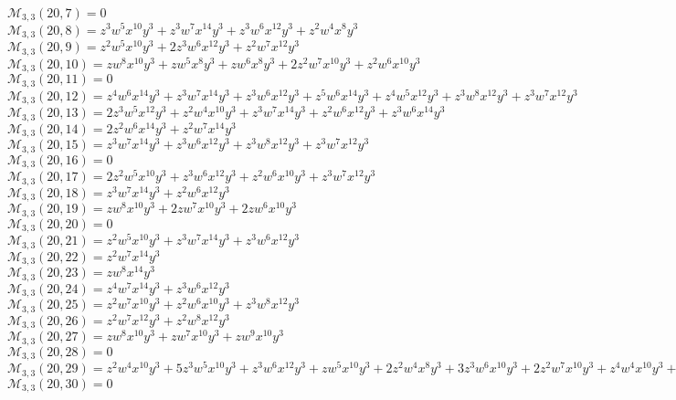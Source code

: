 $\mathcal{M}_{3,3}(20,7)=0$\\
$\mathcal{M}_{3,3}(20,8)=z^3w^5x^{10}y^3+z^3w^7x^{14}y^3+z^3w^6x^{12}y^3+z^2w^4x^8y^3$\\
$\mathcal{M}_{3,3}(20,9)=z^2w^5x^{10}y^3+2z^3w^6x^{12}y^3+z^2w^7x^{12}y^3$\\
$\mathcal{M}_{3,3}(20,10)=zw^8x^{10}y^3+zw^5x^8y^3+zw^6x^8y^3+2z^2w^7x^{10}y^3+z^2w^6x^{10}y^3$\\
$\mathcal{M}_{3,3}(20,11)=0$\\
$\mathcal{M}_{3,3}(20,12)=z^4w^6x^{14}y^3+z^3w^7x^{14}y^3+z^3w^6x^{12}y^3+z^5w^6x^{14}y^3+z^4w^5x^{12}y^3+z^3w^8x^{12}y^3+z^3w^7x^{12}y^3$\\
$\mathcal{M}_{3,3}(20,13)=2z^3w^5x^{12}y^3+z^2w^4x^{10}y^3+z^3w^7x^{14}y^3+z^2w^6x^{12}y^3+z^3w^6x^{14}y^3$\\
$\mathcal{M}_{3,3}(20,14)=2z^2w^6x^{14}y^3+z^2w^7x^{14}y^3$\\
$\mathcal{M}_{3,3}(20,15)=z^3w^7x^{14}y^3+z^3w^6x^{12}y^3+z^3w^8x^{12}y^3+z^3w^7x^{12}y^3$\\
$\mathcal{M}_{3,3}(20,16)=0$\\
$\mathcal{M}_{3,3}(20,17)=2z^2w^5x^{10}y^3+z^3w^6x^{12}y^3+z^2w^6x^{10}y^3+z^3w^7x^{12}y^3$\\
$\mathcal{M}_{3,3}(20,18)=z^3w^7x^{14}y^3+z^2w^6x^{12}y^3$\\
$\mathcal{M}_{3,3}(20,19)=zw^8x^{10}y^3+2zw^7x^{10}y^3+2zw^6x^{10}y^3$\\
$\mathcal{M}_{3,3}(20,20)=0$\\
$\mathcal{M}_{3,3}(20,21)=z^2w^5x^{10}y^3+z^3w^7x^{14}y^3+z^3w^6x^{12}y^3$\\
$\mathcal{M}_{3,3}(20,22)=z^2w^7x^{14}y^3$\\
$\mathcal{M}_{3,3}(20,23)=zw^8x^{14}y^3$\\
$\mathcal{M}_{3,3}(20,24)=z^4w^7x^{14}y^3+z^3w^6x^{12}y^3$\\
$\mathcal{M}_{3,3}(20,25)=z^2w^7x^{10}y^3+z^2w^6x^{10}y^3+z^3w^8x^{12}y^3$\\
$\mathcal{M}_{3,3}(20,26)=z^2w^7x^{12}y^3+z^2w^8x^{12}y^3$\\
$\mathcal{M}_{3,3}(20,27)=zw^8x^{10}y^3+zw^7x^{10}y^3+zw^9x^{10}y^3$\\
$\mathcal{M}_{3,3}(20,28)=0$\\
$\mathcal{M}_{3,3}(20,29)=z^2w^4x^{10}y^3+5z^3w^5x^{10}y^3+z^3w^6x^{12}y^3+zw^5x^{10}y^3+2z^2w^4x^8y^3+3z^3w^6x^{10}y^3+2z^2w^7x^{10}y^3+z^4w^4x^{10}y^3+z^2w^5x^8y^3$\\
$\mathcal{M}_{3,3}(20,30)=0$\\
